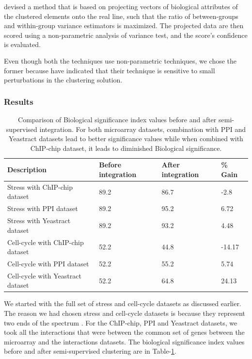 \citet{gatviks03scoring} devised a method that is based on projecting vectors of biological attributes of the clustered elements onto the real line, such that the ratio 
of between-groups and within-group variance estimators is maximized. The projected data are then scored using a non-parametric analysis of variance test, and the 
score's conﬁdence is evaluated.

Even though both the techniques use non-parametric techniques, we chose the former because \citet{gatviks03scoring} have indicated that their technique is sensitive to small perturbations in 
the clustering solution.  


\subsubsection{Results}
\begin{table}
\centering
\begin{tabular}{|l|l|l|l|}
\hline
Description & Before integration & After integration & \% Gain\\
\hline
Stress with ChIP-chip dataset & 89.2 & 86.7 & -2.8\\
Stress with PPI dataset & 89.2 & 95.2 & 6.72\\
Stress with Yeastract dataset & 89.2 & 93.2 & 4.48\\
\hline
Cell-cycle with ChIP-chip dataset & 52.2 & 44.8 & -14.17\\
Cell-cycle with PPI dataset & 52.2 & 55.2 & 5.74\\
Cell-cycle with Yeastract dataset & 52.2 & 64.8 & 24.13\\
\hline 
\end{tabular}
\caption[Comparison of Biological significance index values before and after semi-supervised integration.]{Comparison of Biological significance 
index values before and after semi-supervised integration. For both microarray datasets, combination with PPI and Yeastract datasets lead to better significance values while
when combined with ChIP-chip dataset, it leads to diminished Biological significance.}
\label{tab:biol_significance}
\end{table}

We started with the full set of stress and cell-cycle datasets as discussed earlier. The reason we had chosen stress and cell-cycle datasets is because they represent two ends of the spectrum \citep{amos05integrative}. 
For the ChIP-chip, PPI and Yeastract datasets, we took all the interactions that were between the common set of genes between the microarray and the interactions datasets. 
The biological significance index values before and after semi-supervised clustering are in Table-\ref{tab:biol_significance}. 

